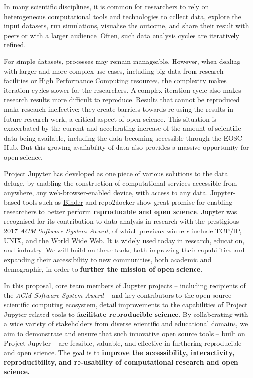 

\begin{draft}

In many scientific disciplines, it is common for researchers to rely on
heterogeneous computational tools and technologies to collect data, explore the
input datasets, run simulations, visualise the outcome, and share their result
with peers or with a larger audience. Often, such data analysis cycles are
iteratively refined.

For simple datasets, processes may remain manageable. However, when dealing with
larger and more complex use cases, including big data from research facilities
or High Performance Computing resources, the complexity makes iteration cycles
slower for the researchers. A complex iteration cycle also makes research
results more difficult to reproduce. Results that cannot be reproduced make
research ineffective: they create barriers towards re-using the results in
future research work, a critical aspect of open science. This situation is
exacerbated by the current and accelerating increase of the amount of scientific
data being available, including the data becoming accessible through the
EOSC-Hub. But this growing availability of data also provides a massive
opportunity for open science.

Project Jupyter has developed as one piece of various solutions to the data
deluge, by enabling the construction of computational services accessible from
anywhere, any web-browser-enabled device, with access to any data. Jupyter-based
tools such as \href{https://mybinder.org}{Binder} and repo2docker show great
promise for enabling researchers to better perform \textbf{reproducible and open
  science}. Jupyter was recognised for its contribution to data analysis in
research with the prestigious 2017 \emph{ACM Software System Award}, of which
previous winners include TCP/IP, UNIX, and the World Wide Web. It is widely used
today in research, education, and industry. We will build on these tools, both
improving their capabilities and expanding their accessibility to new
communities, both academic and demographic, in order to \textbf{further the
  mission of open science}.

In this proposal, core team members of Jupyter projects -- including
recipients of the \emph{ACM Software System Award} -- and key contributors to
the open source scientific computing ecosystem, detail improvements to the
capabilities of Project Jupyter-related tools to \textbf{facilitate reproducible science}.
By collaborating with a wide variety
of stakeholders from diverse scientific and educational domains, we aim to
demonstrate and ensure that such innovative open source tools -- built on Project
Jupyter -- are feasible, valuable, and effective in furthering reproducible and open science. The
goal is to \textbf{improve the accessibility, interactivity,
  reproducibility, and re-usability of computational research and open science.}

\end{draft}

\draftpage

